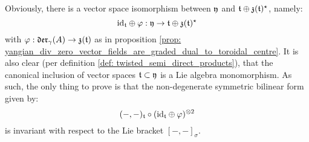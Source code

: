         \begin{remark}
            Obviously, there is a vector space isomorphism between $\mathfrak{y}$ and $\mathfrak{t} \oplus \mathfrak{z}(\mathfrak{t})^{\star}$, namely:
                $$\mathrm{id}_{\mathfrak{t}} \oplus \varphi: \mathfrak{y} \to \mathfrak{t} \oplus \mathfrak{z}(\mathfrak{t})^{\star}$$
            with $\varphi: \mathfrak{der}_{\gamma}(A) \to \mathfrak{z}(\mathfrak{t})$ as in proposition \ref{prop: yangian_div_zero_vector_fields_are_graded_dual_to_toroidal_centre}. It is also clear (per definition \ref{def: twisted_semi_direct_products}), that the canonical inclusion of vector spaces $\mathfrak{t} \subset \mathfrak{y}$ is a Lie algebra monomorphism. As such, the only thing to prove is that the non-degenerate symmetric bilinear form given by:
                $$(-, -)_{\toroidal} \circ (\id_{\toroidal} \oplus \varphi)^{\tensor 2}$$
            is invariant with respect to the Lie bracket $[-, -]_{\sigma}$.
        \end{remark}

